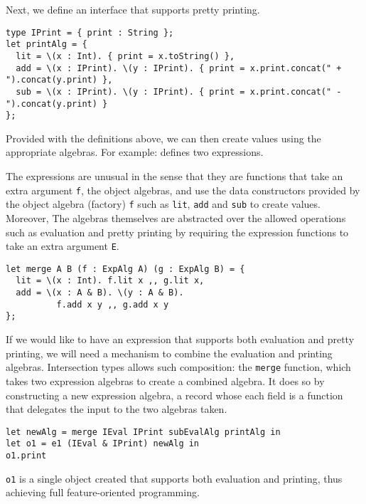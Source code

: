 \documentclass[preprint]{sigplanconf}
\begin{document}
Next, we define an interface that supports pretty printing.

\begin{verbatim}
type IPrint = { print : String };
let printAlg = {
  lit = \(x : Int). { print = x.toString() },
  add = \(x : IPrint). \(y : IPrint). { print = x.print.concat(" + ").concat(y.print) },
  sub = \(x : IPrint). \(y : IPrint). { print = x.print.concat(" - ").concat(y.print) }
};
\end{verbatim}

Provided with the definitions above, we can then create values using the
appropriate algebras. For example:
defines two expressions.

The expressions are unusual in the sense that they are functions that take an
extra argument \lstinline{f}, the object algebras, and use the data constructors
provided by the object algebra (factory) \lstinline{f} such as \lstinline{lit},
\lstinline{add} and \lstinline{sub} to create values. Moreover, The algebras
themselves are abstracted over the allowed operations such as evaluation and
pretty printing by requiring the expression functions to take an extra argument
\lstinline{E}.

\begin{verbatim}
let merge A B (f : ExpAlg A) (g : ExpAlg B) = {
  lit = \(x : Int). f.lit x ,, g.lit x,
  add = \(x : A & B). \(y : A & B).
          f.add x y ,, g.add x y
};
\end{verbatim}

If we would like to have an expression that supports both evaluation and pretty
printing, we will need a mechanism to combine the evaluation and printing
algebras. Intersection types allows such composition: the \lstinline{merge}
function, which takes two expression algebras to create a combined algebra. It
does so by constructing a new expression algebra, a record whose each field is a
function that delegates the input to the two algebras taken.

\begin{verbatim}
let newAlg = merge IEval IPrint subEvalAlg printAlg in
let o1 = e1 (IEval & IPrint) newAlg in
o1.print
\end{verbatim}

\lstinline{o1} is a single object created that supports both evaluation and
printing, thus achieving full feature-oriented programming.
\end{document}

